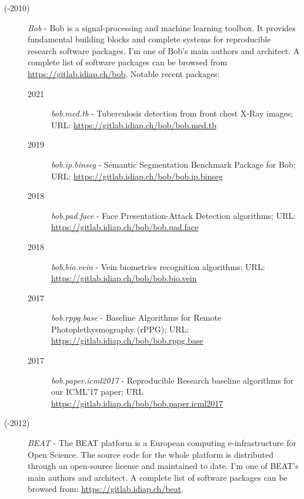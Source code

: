 \documentclass[11pt,a4paper,sans]{moderncv}
\newcounter{currentyear}
\begin{document}
\begin{description}

  \item[\thecurrentyear(-2010)] \textit{Bob} - Bob is a signal-processing and machine
    learning toolbox.  It provides fundamental building blocks and complete
    systems for reproducible research software packages.  I'm one of Bob's main
    authors and architect.  A complete list of software packages can be browsed
    from \url{https://gitlab.idiap.ch/bob}. Notable recent packages:

    \begin{description}
      \item[2021] \textit{bob.med.tb} - Tuberculosis detection from front chest
          X-Ray images; URL: \url{https://gitlab.idiap.ch/bob/bob.med.tb}

      \item[2019] \textit{bob.ip.binseg} - Semantic Segmentation Benchmark
          Package for Bob; URL: \url{https://gitlab.idiap.ch/bob/bob.ip.binseg}

      \item[2018] \textit{bob.pad.face} - Face Presentation-Attack Detection
        algorithms; URL: \url{https://gitlab.idiap.ch/bob/bob.pad.face}

      \item[2018] \textit{bob.bio.vein} - Vein biometrics recognition
        algorithms; URL: \url{https://gitlab.idiap.ch/bob/bob.bio.vein}

      \item[2017] \textit{bob.rppg.base} - Baseline Algorithms for Remote
        Photoplethysmography (rPPG); URL:
        \url{https://gitlab.idiap.ch/bob/bob.rppg.base}

      \item[2017] \textit{bob.paper.icml2017} - Reproducible Research baseline
        algorithms for our ICML'17 paper; URL
        \url{https://gitlab.idiap.ch/bob/bob.paper.icml2017}
    \end{description}


  \item[\thecurrentyear(-2012)] \textit{BEAT} - The BEAT platform is a European
    computing e-infrastructure for Open Science.  The source code for the whole
    platform is distributed through an open-source license and maintained to
    date.  I'm one of BEAT's main authors and architect.  A complete list of
    software packages can be browsed from: \url{https://gitlab.idiap.ch/beat}.

\end{description}
\end{document}
